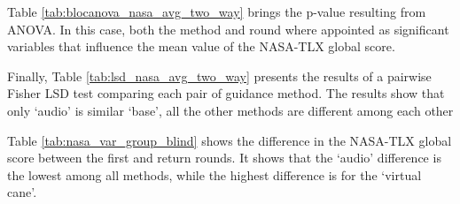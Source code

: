 Table \ref{tab:blocanova_nasa_avg_two_way} brings the p-value resulting from ANOVA. In this case, both the method and round where appointed as significant variables that influence the mean value of the NASA-TLX global score. 



Finally, Table \ref{tab:lsd_nasa_avg_two_way} presents the results of a pairwise Fisher LSD test comparing each pair of guidance method. The results show that only ‘audio’ is similar ‘base’, all the other methods are different among each other



Table \ref{tab:nasa_var_group_blind} shows the difference in the NASA-TLX global score between the first and return rounds. It shows that the ‘audio’ difference is the lowest among all methods, while the highest difference is for the ‘virtual cane’.




